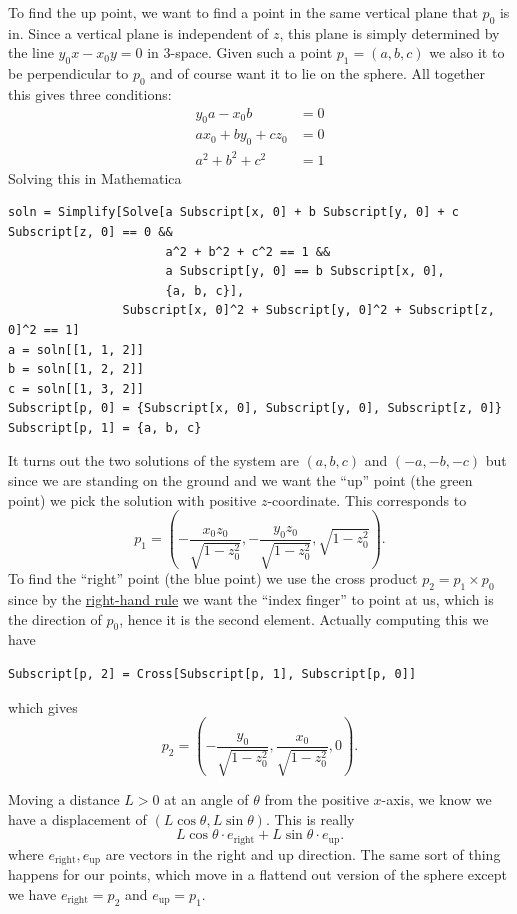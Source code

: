 \documentclass[a4paper,10pt]{article}
\begin{document}
To find the up point, we want to find a point in the same vertical plane
that \(p_0\) is in. Since a vertical plane is independent of \(z\), this
plane is simply determined by the line \(y_0 x - x_0 y = 0\) in \(3\)-space.
Given such a point \(p_1 = (a, b, c)\) we also it to be perpendicular to
\(p_0\) and of course want it to lie on the sphere. All together this
gives three conditions:
\begin{align*}
y_0 a - x_0 b &= 0 \\
a x_0 + b y_0 + c z_0 &= 0 \\
a^2 + b^2 + c^2 &= 1
\end{align*}
Solving this in Mathematica
\begin{verbatim}
soln = Simplify[Solve[a Subscript[x, 0] + b Subscript[y, 0] + c Subscript[z, 0] == 0 &&
                      a^2 + b^2 + c^2 == 1 &&
                      a Subscript[y, 0] == b Subscript[x, 0],
                      {a, b, c}],
                Subscript[x, 0]^2 + Subscript[y, 0]^2 + Subscript[z, 0]^2 == 1]
a = soln[[1, 1, 2]]
b = soln[[1, 2, 2]]
c = soln[[1, 3, 2]]
Subscript[p, 0] = {Subscript[x, 0], Subscript[y, 0], Subscript[z, 0]}
Subscript[p, 1] = {a, b, c}
\end{verbatim}
It turns out the two solutions of the system are \((a, b, c)\) and \((-a,
-b, -c)\) but since we are standing on the ground and we want the ``up''
point (the green point) we pick the solution with positive \(z\)-coordinate.
This corresponds to
\[p_1 = \left(-\frac{x_0 z_0}{\sqrt{1 - z_0^2}},
-\frac{y_0 z_0}{\sqrt{1 - z_0^2}}, \sqrt{1 - z_0^2}\right).\]
To find the ``right'' point (the blue point) we use the cross product
\(p_2 = p_1 \times p_0\) since by the
\href{http://en.wikipedia.org/wiki/Right-hand_rule}{right-hand rule} we
want the ``index finger'' to point at us, which is the direction of
\(p_0\), hence it is the second element. Actually computing this we have
\begin{verbatim}
Subscript[p, 2] = Cross[Subscript[p, 1], Subscript[p, 0]]
\end{verbatim}
which gives
\[p_2 = \left(-\frac{y_0}{\sqrt{1 - z_0^2}}, \frac{x_0}{\sqrt{1 - z_0^2}},
0\right).\]

Moving a distance \(L > 0\) at an angle of \(\theta\) from the positive
\(x\)-axis, we know we have a displacement of \((L \cos \theta, L
\sin \theta)\). This is really
\[L \cos \theta \cdot e_{\text{right}} + L \sin \theta \cdot
e_{\text{up}}.\]
where \(e_{\text{right}}, e_{\text{up}}\) are vectors in the right and up
direction. The same sort of thing happens for our points, which move in
a flattend out version of the sphere except we have
\(e_{\text{right}} = p_2\) and \(e_{\text{up}} = p_1\).
\end{document}
